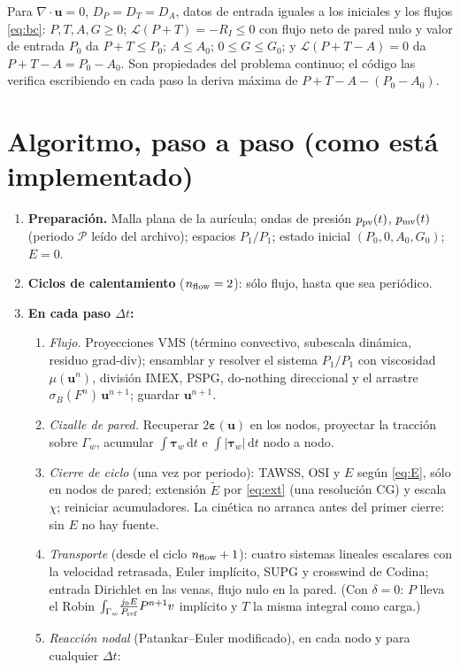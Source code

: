 \documentclass[11pt,a4paper]{article}
\newcommand{\dd}{\,\mathrm{d}}
\newcommand{\bu}{\bm{u}}
\newcommand{\Lc}{\mathcal{L}}
\newcommand{\Pref}{P_{\rm ref}}
\begin{document}
Para $\nabla\!\cdot\!\bu=0$, $D_P=D_T=D_A$, datos de entrada iguales a los iniciales y los flujos \eqref{eq:bc}: $P,T,A,G\ge0$; $\Lc(P+T)=-R_I\le0$ con flujo neto de pared nulo y valor de entrada $P_0$ da $P+T\le P_0$; $A\le A_0$; $0\le G\le G_0$; y $\Lc(P+T-A)=0$ da $P+T-A=P_0-A_0$. Son propiedades del problema continuo; el código las verifica escribiendo en cada paso la deriva máxima de $P+T-A-(P_0-A_0)$.

\section{Algoritmo, paso a paso (como está implementado)}

\begin{enumerate}[leftmargin=1.6em]
\item \textbf{Preparación.} Malla plana de la aurícula; ondas de presión $p_{\rm pv}(t)$, $p_{\rm mv}(t)$ (periodo $\mathcal P$ leído del archivo); espacios $P_1/P_1$; estado inicial $(P_0,0,A_0,G_0)$; $E=0$.
\item \textbf{Ciclos de calentamiento} ($n_{\rm flow}=2$): sólo flujo, hasta que sea periódico.
\item \textbf{En cada paso $\Delta t$:}
\begin{enumerate}[leftmargin=1.4em]
\item \emph{Flujo.} Proyecciones VMS (término convectivo, subescala dinámica, residuo grad-div); ensamblar y resolver el sistema $P_1/P_1$ con viscosidad $\mu(\bu^n)$, división IMEX, PSPG, do-nothing direccional y el arrastre $\sigma_B(F^n)\,\bu^{n+1}$; guardar $\bu^{n+1}$.
\item \emph{Cizalle de pared.} Recuperar $2\bm\varepsilon(\bu)$ en los nodos, proyectar la tracción sobre $\Gamma_w$, acumular $\int\bm\tau_w\dd t$ e $\int|\bm\tau_w|\dd t$ nodo a nodo.
\item \emph{Cierre de ciclo} (una vez por periodo): TAWSS, OSI y $E$ según \eqref{eq:E}, sólo en nodos de pared; extensión $\tilde E$ por \eqref{eq:ext} (una resolución CG) y escala $\chi$; reiniciar acumuladores. La cinética no arranca antes del primer cierre: sin $E$ no hay fuente.
\item \emph{Transporte} (desde el ciclo $n_{\rm flow}+1$): cuatro sistemas lineales escalares con la velocidad retrasada, Euler implícito, SUPG y crosswind de Codina; entrada Dirichlet en las venas, flujo nulo en la pared. (Con $\delta=0$: $P$ lleva el Robin $\int_{\Gamma_w}\!\frac{j_0E}{\Pref}P^{n+1}v$ implícito y $T$ la misma integral como carga.)
\item \emph{Reacción nodal} (Patankar--Euler modificado), en cada nodo y para cualquier $\Delta t$:

\end{enumerate}
\end{enumerate}
\end{document}
